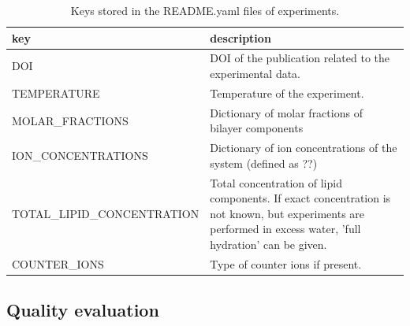 \documentclass[fleqn,10pt]{wlscirep}
\begin{document}
\begin{table}[]
    \centering
    \begin{tabular}{  p{5.0cm}  p{10.0cm}}
    \toprule
    key & description \\
    \midrule
    DOI & DOI of the publication related to the experimental data. \\
    TEMPERATURE & Temperature of the experiment. \\
    MOLAR\_FRACTIONS & Dictionary of molar fractions of bilayer components \\
    ION\_CONCENTRATIONS & Dictionary of ion concentrations of the system (defined as ??) \\
    TOTAL\_LIPID\_CONCENTRATION & Total concentration of lipid components. If exact concentration is not known, but experiments are performed in excess water, 'full hydration' can be given. \\
    COUNTER\_IONS & Type of counter ions if present.
\end{tabular}
    \caption{Keys stored in the README.yaml files of experiments.}
    \label{tab:READMEkeysEXP}
\end{table}

\subsection{Quality evaluation}
\end{document}

